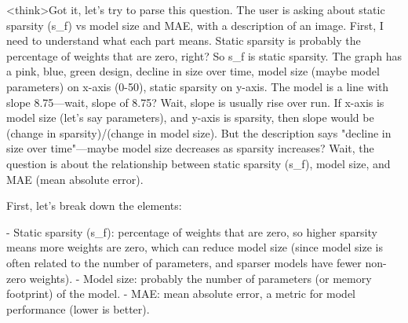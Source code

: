 <think>Got it, let's try to parse this question. The user is asking about static sparsity (s_f) vs model size and MAE, with a description of an image. First, I need to understand what each part means. Static sparsity is probably the percentage of weights that are zero, right? So s_f is static sparsity. The graph has a pink, blue, green design, decline in size over time, model size (maybe model parameters) on x-axis (0-50), static sparsity on y-axis. The model is a line with slope 8.75—wait, slope of 8.75? Wait, slope is usually rise over run. If x-axis is model size (let's say parameters), and y-axis is sparsity, then slope would be (change in sparsity)/(change in model size). But the description says "decline in size over time"—maybe model size decreases as sparsity increases? Wait, the question is about the relationship between static sparsity (s_f), model size, and MAE (mean absolute error). 

First, let's break down the elements:

- Static sparsity (s_f): percentage of weights that are zero, so higher sparsity means more weights are zero, which can reduce model size (since model size is often related to the number of parameters, and sparser models have fewer non-zero weights). 
- Model size: probably the number of parameters (or memory footprint) of the model. 
- MAE: mean absolute error, a metric for model performance (lower is better). 

